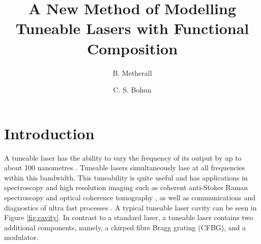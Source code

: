 \documentclass[graybox]{svmult}
\begin{document}
\title*{A New Method of Modelling Tuneable Lasers with Functional Composition}
\author{B. Metherall \and C. S. Bohun}
%
%
\maketitle


\section{Introduction}
\label{sec:intro}
A tuneable laser has the ability to vary the frequency of its output by up to about 100 nanometres \cite{bohun, burgoyne2010, yamashita}. Tuneable lasers simultaneously lase at all frequencies within this bandwidth. This tuneability is quite useful and has applications in spectroscopy and high resolution imaging such as coherent anti-Stokes Raman spectroscopy and optical coherence tomography \cite{bohun, burgoyne2014, yamashita}, as well as communications and diagnostics of ultra fast processes \cite{silfvast}. A typical tuneable laser cavity can be seen in Figure \ref{fig:cavity}. In contrast to a standard laser, a tuneable laser contains two additional components, namely, a chirped fibre Bragg grating (CFBG), and a modulator.
\end{document}

